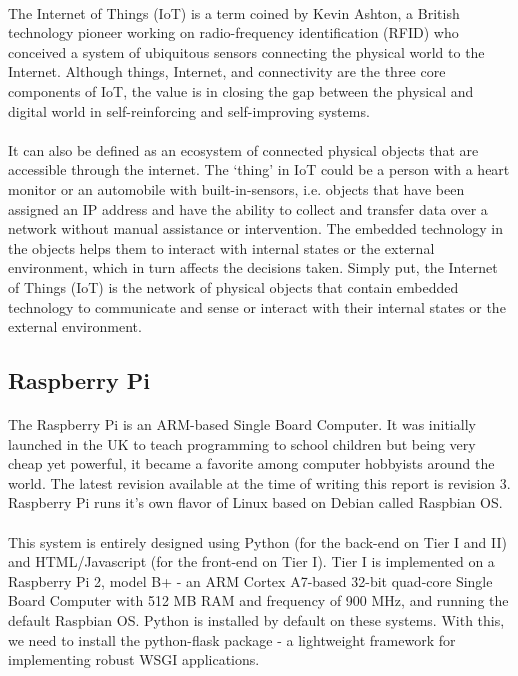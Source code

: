 \paragraph{}
The Internet of Things (IoT) is a term coined by Kevin Ashton, a British technology pioneer working on radio-frequency identification (RFID) who conceived a system of ubiquitous sensors connecting the physical world to the Internet. Although things, Internet, and connectivity are the three core components of IoT, the value is in closing the gap between the physical and digital world in self-reinforcing and self-improving systems.
\paragraph{}
It can also be defined as an ecosystem of connected physical objects that are accessible through the internet. The ‘thing’ in IoT could be a person with a heart monitor or an automobile with built-in-sensors, i.e. objects that have been assigned an IP address and have the ability to collect and transfer data over a network without manual assistance or intervention. The embedded technology in the objects helps them to interact with internal states or the external environment, which in turn affects the decisions taken. Simply put, the Internet of Things (IoT) is the network of physical objects that contain embedded technology to communicate and sense or interact with their internal states or the external environment.

\subsection{Raspberry Pi}
\paragraph{}
The Raspberry Pi is an ARM-based Single Board Computer. It was initially launched in the UK to teach programming to school children but being very cheap yet powerful, it became a favorite among computer hobbyists around the world. The latest revision available at the time of writing this report is revision 3. Raspberry Pi runs it's own flavor of Linux based on Debian called Raspbian OS.
\paragraph{}
This system is entirely designed using Python (for the back-end on Tier I and II) and HTML/Javascript (for the front-end on Tier I). Tier I is implemented on a Raspberry Pi 2, model B+ - an ARM Cortex A7-based 32-bit quad-core Single Board Computer with 512 MB RAM and frequency of 900 MHz, and running the default Raspbian OS. Python is installed by default on these systems. With this, we need to install the python-flask package - a lightweight framework for implementing robust WSGI applications.


